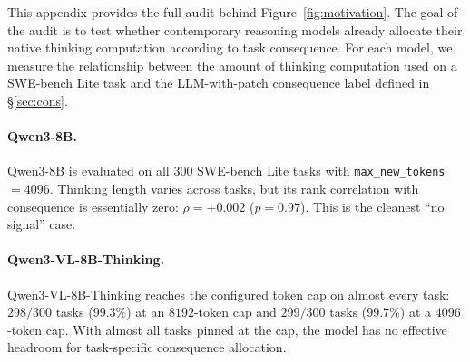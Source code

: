 \documentclass{article}
\begin{document}
This appendix provides the full audit behind Figure~\ref{fig:motivation}.
The goal of the audit is to test whether contemporary reasoning models
already allocate their native thinking computation according to task
consequence. For each model, we measure the relationship between the
amount of thinking computation used on a SWE-bench Lite task and the
LLM-with-patch consequence label defined in \S\ref{sec:cons}.

\begin{table}[h]
\centering
{}
\caption{\textbf{Native thinking allocation audit on SWE-bench Lite.}
We report sample size, configured token budget, Spearman correlation
between thinking length and consequence, and the observed failure mode.
The audited models exhibit no consequence signal, saturation, or weak
adaptation.}
\label{tab:audit-app}
\end{table}

\paragraph{Qwen3-8B.}
Qwen3-8B is evaluated on all $300$ SWE-bench Lite tasks with
\texttt{max\_new\_tokens}$=4096$. Thinking length varies across tasks,
but its rank correlation with consequence is essentially zero:
$\rho=+0.002$ ($p=0.97$). This is the cleanest ``no signal'' case.

\paragraph{Qwen3-VL-8B-Thinking.}
Qwen3-VL-8B-Thinking reaches the configured token cap on almost every
task: $298/300$ tasks ($99.3\%$) at an $8192$-token cap and
$299/300$ tasks ($99.7\%$) at a $4096$-token cap. With almost all
tasks pinned at the cap, the model has no effective headroom for
task-specific consequence allocation.
\end{document}
